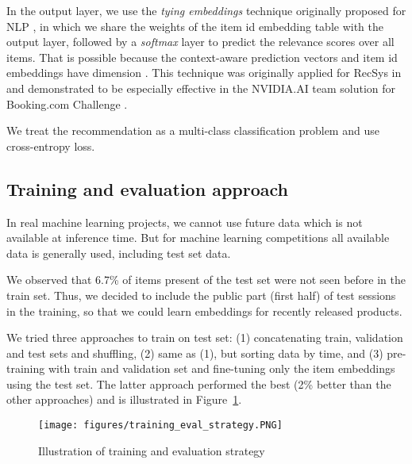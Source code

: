 \documentclass[sigconf,screen]{acmart}
\begin{document}
In the output layer, we use the \emph{tying embeddings} technique originally proposed for NLP \cite{inan2016tying,press2017using}, in which we share the weights of the item id embedding table with the output layer, followed by a \emph{softmax} layer to predict the relevance scores over all items. That is possible because the context-aware prediction vectors  and item id embeddings have dimension . This technique was originally applied for RecSys in \cite{hidasi2018recurrent} and demonstrated to be especially effective in the NVIDIA.AI team solution for Booking.com Challenge \cite{schifferer2021}.

We treat the recommendation as a multi-class classification problem and use cross-entropy loss. 





\vspace{-3.0mm}

\subsection{Training and evaluation approach}

In real machine learning projects, we cannot use future data which is not available at inference time. But for machine learning competitions all available data is generally used, including test set data.

We observed that 6.7\% of items present of the test set were not seen before in the train set. Thus, we decided to include the public part (first half) of test sessions in the training, so that we could learn embeddings for recently released products. 

We tried three approaches to train on test set: (1) concatenating train, validation and test sets and shuffling, (2) same as (1), but sorting data by time, and (3) pre-training with train and validation set and fine-tuning only the item embeddings using the test set. The latter approach performed the best (2\% better than the other approaches) and is illustrated in Figure~\ref{fig:train_eval_strategy}. 

\vspace{-4.0mm}

\begin{figure}[h]
  \centering
  \texttt{[image: figures/training\_eval\_strategy.PNG]}
  \caption{Illustration of training and evaluation strategy}
  \label{fig:train_eval_strategy}
\end{figure}
\end{document}
